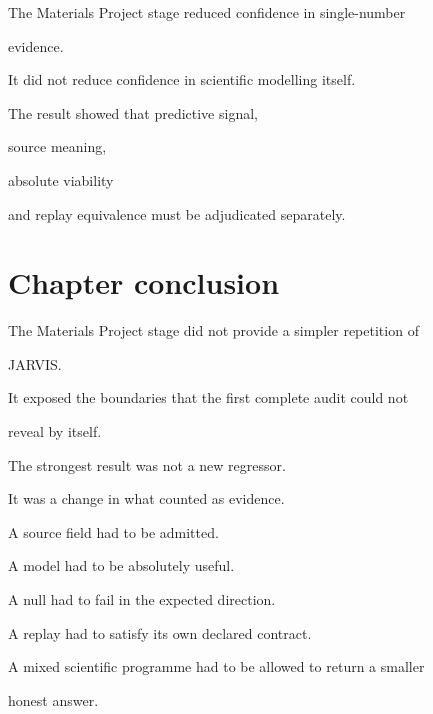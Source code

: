 \documentclass[11pt,a4paper,oneside]{report}
\begin{document}
\begin{claimboundary}



The Materials Project stage reduced confidence in single-number

evidence.



It did not reduce confidence in scientific modelling itself.



The result showed that predictive signal,

source meaning,

absolute viability

and replay equivalence must be adjudicated separately.



\end{claimboundary}





\section{Chapter conclusion}



The Materials Project stage did not provide a simpler repetition of

JARVIS.



It exposed the boundaries that the first complete audit could not

reveal by itself.



The strongest result was not a new regressor.



It was a change in what counted as evidence.



A source field had to be admitted.



A model had to be absolutely useful.



A null had to fail in the expected direction.



A replay had to satisfy its own declared contract.



A mixed scientific programme had to be allowed to return a smaller

honest answer.
\end{document}
